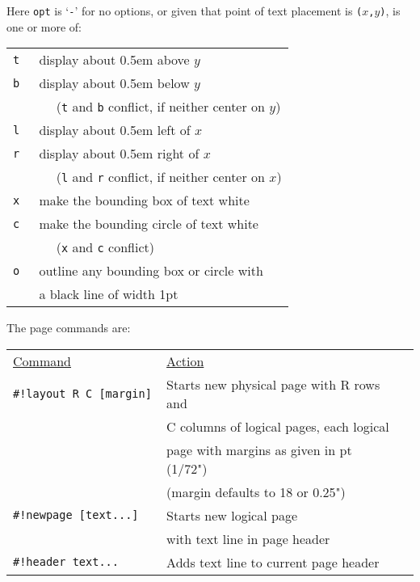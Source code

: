 \documentclass[12pt]{article}
\begin{document}
\begin{minipage}{\textwidth}
Here {\tt opt} is `{\tt -}' for no options, or given that point
of text placement is {\tt ($x$,$y$)}, is one or more of:
\\[1ex]
\hspace*{0.5in}\begin{tabular}{rl}
    \tt t & display about 0.5em above $y$ \\
    \tt b & display about 0.5em below $y$ \\
          & ~~ ({\tt t} and {\tt b} conflict, if neither center on $y$) \\
    \tt l & display about 0.5em left of $x$ \\
    \tt r & display about 0.5em right of $x$ \\
          & ~~ ({\tt l} and {\tt r} conflict, if neither center on $x$) \\
    \tt x & make the bounding box of text white \\
    \tt c & make the bounding circle of text white \\
          & ~~ ({\tt x} and {\tt c} conflict) \\
    \tt o & outline any bounding box or circle with \\
          & a black line of width 1pt \\
    \end{tabular}
\end{minipage}


\begin{minipage}{\textwidth}
The page commands are:
\\[1ex]
\begin{tabular}{@{}l@{~~~~~}l@{~~~~~}l@{}}
\underline{Command} & \underline{Action}
\\[1ex]
\tt \#!layout R C [margin]   & Starts new physical page with R rows and \\
                             & C columns of logical pages, each logical \\
			     & page with margins as given in pt (1/72") \\
			     & (margin defaults to 18 or 0.25") \\
\tt \#!newpage [text...] & Starts new logical page \\
                         & with text line in page header \\
\tt \#!header text... & Adds text line to current page header \\
\end{tabular}
\end{minipage}
\end{document}
